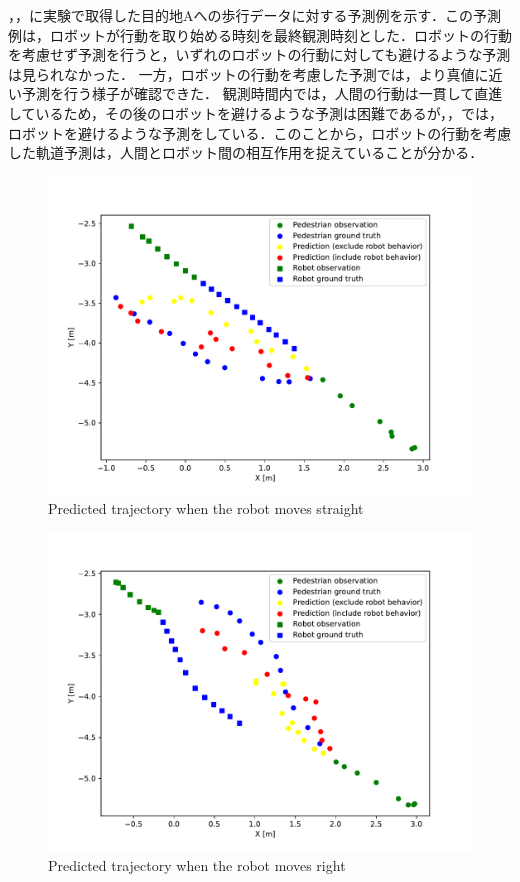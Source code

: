 ，，に実験で取得した目的地Aへの歩行データに対する予測例を示す．この予測例は，ロボットが行動を取り始める時刻を最終観測時刻とした．ロボットの行動を考慮せず予測を行うと，いずれのロボットの行動に対しても避けるような予測は見られなかった．
一方，ロボットの行動を考慮した予測では，より真値に近い予測を行う様子が確認できた．
観測時間内では，人間の行動は一貫して直進しているため，その後のロボットを避けるような予測は困難であるが，，では，ロボットを避けるような予測をしている．このことから，ロボットの行動を考慮した軌道予測は，人間とロボット間の相互作用を捉えていることが分かる．

\vspace{-10pt}

\begin{figure}[H]
  \centering
 \includegraphics[keepaspectratio, scale=0.58]
      {images/pred_straight.pdf}
\caption{Predicted trajectory when the robot moves straight}
 \label{Fig:pred-straight}
\end{figure}

\begin{figure}[H]
  \centering
 \includegraphics[keepaspectratio, scale=0.58]
      {images/pred_right.pdf}
\caption{Predicted trajectory when the robot moves right}
 \label{Fig:pred-right}
\end{figure}

